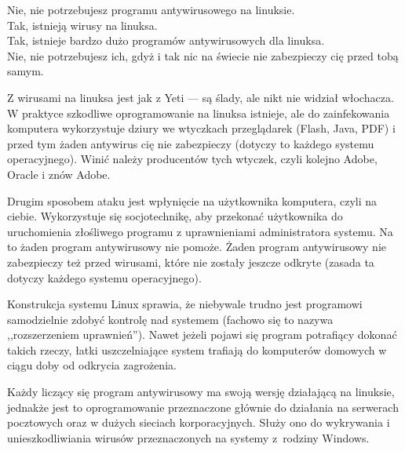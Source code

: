 \noindent \textcolor{ubuntu_orange}{Nie}, nie potrzebujesz programu antywirusowego na linuksie.\\
\textcolor{ubuntu_orange}{Tak}, istnieją wirusy na linuksa.\\
\textcolor{ubuntu_orange}{Tak}, istnieje bardzo dużo programów antywirusowych dla linuksa.\\
\textcolor{ubuntu_orange}{Nie}, nie potrzebujesz ich, gdyż i tak nic na świecie nie zabezpieczy cię przed tobą samym.

Z wirusami na linuksa jest jak z Yeti --- są ślady, ale nikt nie widział włochacza. W praktyce szkodliwe oprogramowanie na linuksa istnieje, ale do zainfekowania komputera wykorzystuje dziury we wtyczkach przeglądarek (Flash, Java, PDF) i przed tym żaden antywirus cię nie zabezpieczy (dotyczy to każdego systemu operacyjnego). Winić należy producentów tych wtyczek, czyli kolejno Adobe, Oracle i znów Adobe.

Drugim sposobem ataku jest wpłynięcie na użytkownika komputera, czyli na ciebie. Wykorzystuje się socjotechnikę, aby przekonać użytkownika do uruchomienia złośliwego programu z uprawnieniami administratora systemu. Na to żaden program antywirusowy nie pomoże. Żaden program antywirusowy nie zabezpieczy też przed wirusami, które nie zostały jeszcze odkryte (zasada ta dotyczy każdego systemu operacyjnego).

Konstrukcja systemu Linux sprawia, że niebywale trudno jest programowi samodzielnie zdobyć kontrolę nad systemem (fachowo się to nazywa ,,rozszerzeniem uprawnień''). Nawet jeżeli pojawi się program potrafiący dokonać takich rzeczy, łatki uszczelniające system trafiają do komputerów domowych w ciągu doby od odkrycia zagrożenia.

Każdy liczący się program antywirusowy ma swoją wersję działającą na linuksie, jednakże jest to oprogramowanie przeznaczone głównie do działania na serwerach pocztowych oraz w dużych sieciach korporacyjnych. Służy ono do wykrywania i unieszkodliwiania wirusów przeznaczonych na systemy z~rodziny Windows.

